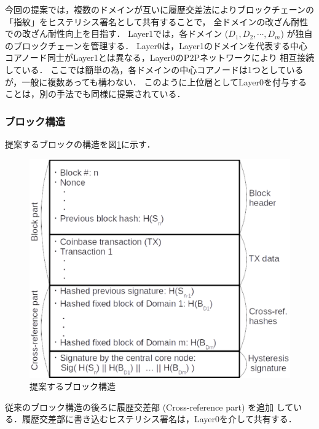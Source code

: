 \documentclass[a4paper,12pt]{jsarticle}
\begin{document}
今回の提案では，複数のドメインが互いに履歴交差法によりブロックチェーンの「指紋」をヒステリシス署名として共有することで，
全ドメインの改ざん耐性での改ざん耐性向上を目指す．
Layer1では，各ドメイン ($D_1, D_2, \cdots, D_m$) が独自のブロックチェーンを管理する．
Layer0は，Layer1のドメインを代表する中心コアノード同士がLayer1とは異なる，Layer0のP2Pネットワークにより
相互接続している．
ここでは簡単の為，各ドメインの中心コアノードは1つとしているが，一般に複数あっても構わない．
このように上位層としてLayer0を付与することは，別の手法でも同様に提案されている\cite{bloX}．

      \subsubsection{ブロック構造}
提案するブロックの構造を図\ref{fig:block}に示す．
%
\begin{figure}[tbh]
  \begin{center}
    \includegraphics{pht/block_structure.eps}
  \end{center}
  \caption{提案するブロック構造}
  \label{fig:block}
\end{figure}
%
従来のブロック構造の後ろに履歴交差部 (Cross-reference part) を追加
している．履歴交差部に書き込むヒステリシス署名は，Layer0を介して共有する．
\end{document}
